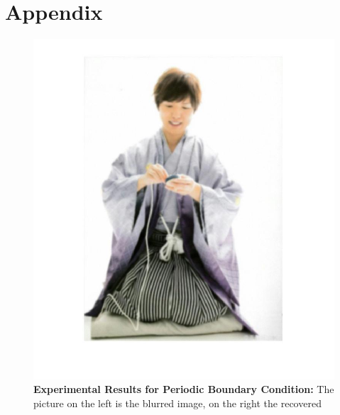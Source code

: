 \documentclass{article}
\theoremstyle{plain} \newtheorem{thm}{Theorem}
\begin{document}
\section{Appendix}
\begin{figure}
	\caption{\textbf{Experimental Results for Periodic Boundary Condition:} The picture on the left is the blurred image, on the right the recovered}
	\begin{minipage}{.5\linewidth}
		\includegraphics[width=\textwidth]{kamiya_blurred_cyclic.jpg}
	\end{minipage}
	\begin{minipage}{.5\linewidth}

\end{minipage}
\end{figure}
\end{document}
